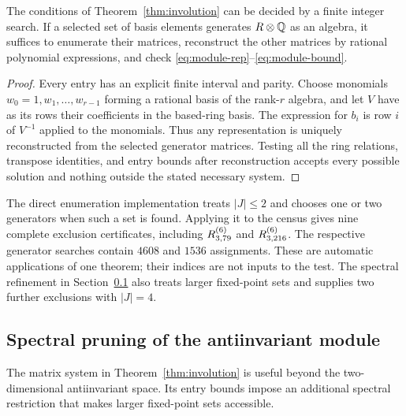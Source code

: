 \begin{proposition}\label{prop:module-enum}
The conditions of Theorem~\ref{thm:involution} can be decided by a finite
integer search. If a selected set of basis elements generates $R\otimes\mathbb Q$
as an algebra, it suffices to enumerate their matrices, reconstruct the
other matrices by rational polynomial expressions, and check
\eqref{eq:module-rep}--\eqref{eq:module-bound}.
\end{proposition}
\begin{proof}
Every entry has an explicit finite interval and parity. Choose monomials
$w_0=1,w_1,\ldots,w_{r-1}$ forming a rational basis of the rank-$r$ algebra,
and let $V$ have as its rows their coefficients in the based-ring basis.
The expression for $b_i$ is row $i$ of $V^{-1}$ applied to the monomials.
Thus any representation is uniquely reconstructed from the selected
generator matrices. Testing all the ring relations, transpose identities,
and entry bounds after reconstruction accepts every possible solution
and nothing outside the stated necessary system.
\end{proof}

The direct enumeration implementation treats $|J|\le2$ and chooses one
or two generators when such a set is found. Applying it to the census
gives nine complete exclusion certificates, including $R^{(6)}_{3,79}$ and
$R^{(6)}_{3,216}$. The respective generator searches contain $4608$ and
$1536$ assignments. These are automatic applications of one theorem;
their indices are not inputs to the test. The spectral refinement in
Section~\ref{sec:spectral-involution} also treats larger fixed-point sets
and supplies two further exclusions with $|J|=4$.


\subsection{Spectral pruning of the antiinvariant module}
\label{sec:spectral-involution}
The matrix system in Theorem~\ref{thm:involution} is useful beyond the
two-dimensional antiinvariant space. Its entry bounds impose an additional
spectral restriction that makes larger fixed-point sets accessible.

